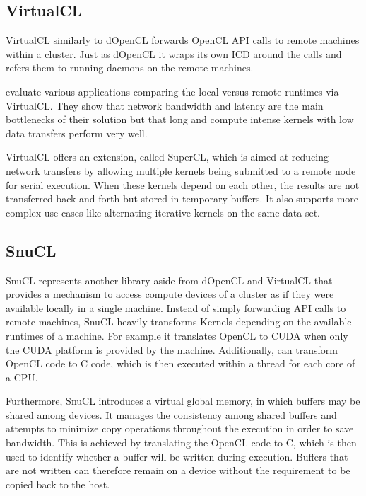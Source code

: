 \subsection*{VirtualCL}

VirtualCL similarly to dOpenCL forwards OpenCL API calls to remote machines within a cluster\cite{virtualcl}. Just as dOpenCL it wraps its own ICD around the calls and refers them to running daemons on the remote machines.

\citeauthor{virtualcl} evaluate various applications comparing the local versus remote runtimes via VirtualCL. They show that network bandwidth and latency are the main bottlenecks of their solution but that long and compute intense kernels with low data transfers perform very well.

VirtualCL offers an extension, called SuperCL, which is aimed at reducing network transfers by allowing multiple kernels being submitted to a remote node for serial execution. When these kernels depend on each other, the results are not transferred back and forth but stored in temporary buffers. It also supports more complex use cases like alternating iterative kernels on the same data set.

\subsection*{SnuCL}

SnuCL represents another library aside from dOpenCL and VirtualCL that provides a mechanism to access compute devices of a cluster as if they were available locally in a single machine\cite{snucl}. Instead of simply forwarding API calls to remote machines, SnuCL heavily transforms Kernels depending on the available runtimes of a machine. For example it translates OpenCL to CUDA when only the CUDA platform is provided by the machine. Additionally, can transform OpenCL code to C code, which is then executed within a thread for each core of a CPU.

Furthermore, SnuCL introduces a virtual global memory, in which buffers may be shared among devices. It manages the consistency among shared buffers and attempts to minimize copy operations throughout the execution in order to save bandwidth. This is achieved by translating the OpenCL code to C, which is then used to identify whether a buffer will be written during execution. Buffers that are not written can therefore remain on a device without the requirement to be copied back to the host.


